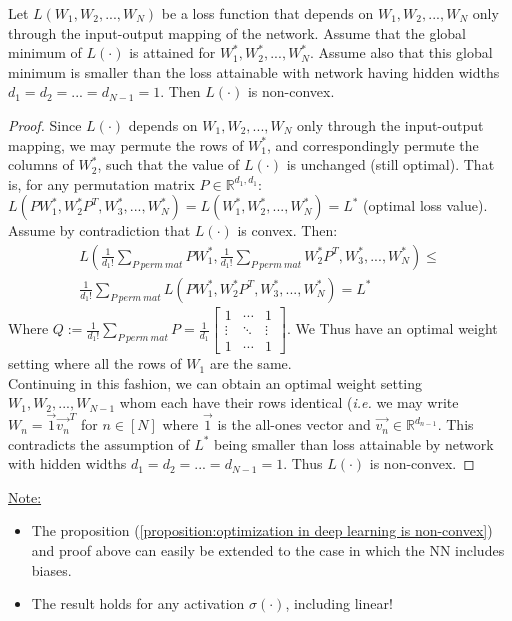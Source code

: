 \documentclass[12pt]{article}
\newcommand{\ie}{{\it i.e. }}
\begin{document}
	\begin{proposition}
	\label{proposition:optimization in deep learning is non-convex}				
		Let $L(W_1,W_2,...,W_N)$ be a loss function that depends on $W_1,W_2,...,W_N$ only through the input-output mapping of the network.
		Assume that the global minimum of $L(\cdot)$ is attained for $W_1^\ast, W_2^\ast,...,W_N^\ast$.
		Assume also that this global minimum is smaller than the loss attainable with network having hidden widths $d_1=d_2=...=d_{N-1}=1$.
		Then $L(\cdot)$ is non-convex.
	\end{proposition}
	\begin{proof}
		Since $L(\cdot)$ depends on $W_1,W_2,...,W_N$ only through the input-output mapping, we may permute the rows of $W_1^\ast$, and correspondingly permute the columns of $W_2^\ast$, such that the value of $L(\cdot)$ is unchanged (still optimal).
		That is, for any permutation matrix
		$P\in\mathbb{R}^{d_1,d_1}$: $L(PW_1^\ast,W_2^{\ast}P^T,W_3^\ast,...,W_N^\ast)=L(W_1^\ast,W_2^\ast,...,W_N^\ast)=L^\ast$ (optimal loss value).
		\\Assume by contradiction that $L(\cdot)$ is convex. Then:
		\begin{align*}
    		L(\frac{1}{d_1!}\textstyle \sum_{P\ perm\ mat}{PW_1^\ast}, \frac{1}{d_1!}\textstyle \sum_{P\ perm\ mat} W_2^{\ast}P^T, W_3^\ast, ..., W_N^\ast) \leq
    		\\\frac{1}{d_1!}\sum_{P\ perm\ mat}L(PW_1^\ast,W_2^{\ast}P^T,W_3^\ast,...,W_N^\ast)=L^\ast
	    \end{align*}
	    Where $Q:=\frac{1}{d_1!}\sum_{P\ perm\ mat}P = \frac{1}{d_1}
	    \begin{bmatrix}
	        1 & \cdots & 1 \\
	        \vdots & \ddots & \vdots \\
	        1 & \cdots & 1
	    \end{bmatrix}$.
	    We Thus have an optimal weight setting where all the rows of $W_1$ are the same.
	    \\Continuing in this fashion, we can obtain an optimal weight setting $W_1,W_2,...,W_{N-1}$ whom each have their rows identical (\ie we may write $W_n=\vec{1}\overrightarrow{v_n}^T$ for $n\in[N]$ where $\vec{1}$ is the all-ones vector and $\overrightarrow{v_n}\in\mathbb{R}^{d_{n-1}}$. This contradicts the assumption of $L^\ast$ being smaller than loss attainable by network with hidden widths $d_1=d_2=...=d_{N-1}=1$. Thus $L(\cdot)$ is non-convex.
	\end{proof}
	\noindent\underline{Note:}
	\begin{itemize}
      \item The proposition (\ref{proposition:optimization in deep learning is non-convex}) and proof above can easily be extended to the case in which the NN includes biases.
      \item The result holds for any activation $\sigma(\cdot)$, including linear!
    \end{itemize}
\end{document}
